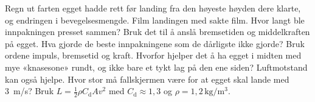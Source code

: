 \documentclass[11pt]{article}
\begin{document}
\begin{oppgaveliste}
\oppgave {}Regn ut farten egget hadde rett før landing fra den høyeste høyden dere klarte, og endringen i bevegelsesmengde.
\svar
\oppgave {}Film landingen med sakte film. Hvor langt ble innpakningen presset sammen? Bruk det til å anslå bremsetiden og middelkraften på egget.
\svar
\oppgave {}Hva gjorde de beste innpakningene som de dårligste ikke gjorde? Bruk ordene impuls, bremsetid og kraft.
\svar
\oppgave {}Hvorfor hjelper det å ha egget i midten med mye «knasesone» rundt, og ikke bare et tykt lag på den ene siden?
\svar
\oppgave {}Luftmotstand kan også hjelpe. Hvor stor må fallskjermen være for at egget skal lande med 3~m/s? Bruk $L = \tfrac{1}{2}ρC_{\mathrm{d}}Av^{2}$ med $C_{\mathrm{d}} \approx 1{,}3$ og $ρ = 1{,}2\,\mathrm{kg/m^{3}}$.
\svar
\end{oppgaveliste}
\end{document}
